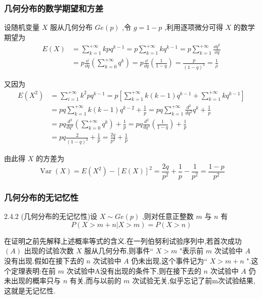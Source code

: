 \subsubsection{几何分布的数学期望和方差}

设随机变量 $ X $ 服从几何分布 $ Ge(p) $ ,令 $ g=1-p $ ,利用逐项微分可得 $ X $ 的数学期望为
\[
\begin{aligned} E(X) &=\sum_{k=1}^{+\infty} k p q^{k-1} =p \sum_{k=1}^{+\infty} k q^{k-1}=p \sum_{k=1}^{+\infty} \frac{\dd q^{k}}{\dd q} \\ &=p \frac{\dd}{\dd q}\left(\sum_{k=0}^{+\infty} q^{k}\right)=p \frac{\dd}{\dd q}\left(\frac{1}{1-q}\right)=\frac{p}{(1-q)^{2}}=\frac{1}{\rho} \end{aligned}
\]

又因为
\[
\begin{aligned} 
E\left(X^{2}\right) &=\sum_{i=1}^{+\infty} k^{2} p q^{k-1}=p\left[\sum_{k=1}^{+\infty} k(k-1) q^{k-1}+\sum_{k=1}^{+\infty} k q^{k-1}\right] \\ 
&=p q \sum_{k=1}^{+\infty} k(k-1) q^{k-2}+\frac{1}{p}=p q \sum_{k=1}^{+\infty} \frac{d^{2}}{d q^{2}} q^{k}+\frac{1}{p}\\
&  {=p q \frac{d^{2}}{d q^{2}}\left(\sum_{k=0}^{+\infty} q^{k}\right)+\frac{1}{p}=p q \frac{d^{2}}{d q^{2}}\left(\frac{1}{1-q}\right)+\frac{1}{p}}\\
& {=p q \frac{2}{(1-q)^{3}}+\frac{1}{p}=\frac{2 q}{p^{2}}+\frac{1}{p}}
\end{aligned}
\]

由此得 $ X $ 的方差为
\[
\operatorname{Var}(X)=E\left(X^{2}\right)-[E(X)]^{2}=\frac{2 q}{p^{2}}+\frac{1}{p}-\frac{1}{p^{2}}=\frac{1-p}{p^{2}}
\]


\subsubsection{几何分布的无记忆性}

\begin{theorem}{}{2.4.2}
	(几何分布的无记忆性)设 $ X \sim G e(p) $ ,则对任意正整数 $ m $ 与 $ n $ 有
	\begin{equation}
	P(X>m+n | X>m)=P(X>n) \label{eq:2.4.9}
	\end{equation}
\end{theorem}

在证明之前先解释上述概率等式的含义.在一列伯努利试验序列中,若首次成功 $ (A) $ 出现的试验次数 $ X $ 服从几何分布,则事件`` $ X>m $ "表示前 $ m $ 次试验中 $ A $ 没有出现.假如在接下去的 $ n $ 次试验中 $ A $ 仍未出现,这个事件记为`` $ X>m+n $ ".这个定理表明:在前 $ m $ 次试验中A没有出现的条件下,则在接下去的 $ n $ 次试验中 $ A $ 仍未出现的概率只与 $ n $ 有关,而与以前的 $ m $ 次试验无关,似乎忘记了前m次试验结果,这就是无记忆性.


